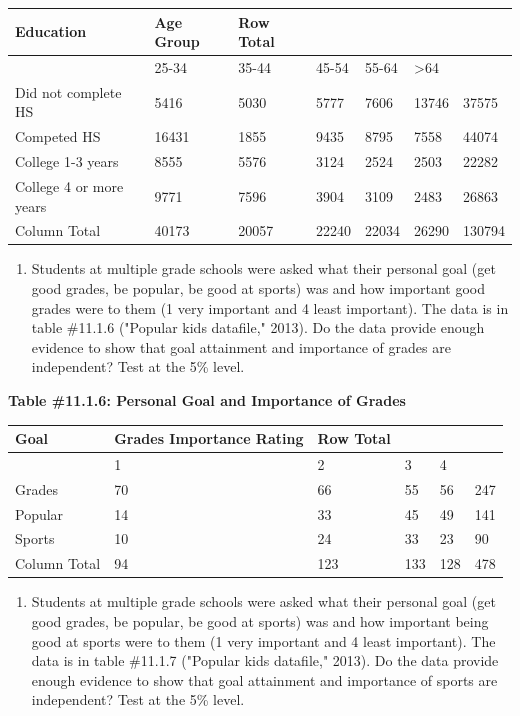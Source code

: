 \documentclass[
]{book}
\providecommand{\tightlist}{%
  \setlength{\itemsep}{0pt}\setlength{\parskip}{0pt}}
\begin{document}
\begin{longtable}[]{@{}lllllll@{}}
\toprule
Education & Age Group & Row Total & & & &\tabularnewline
\midrule
\endhead
& 25-34 & 35-44 & 45-54 & 55-64 & \textgreater64 &\tabularnewline
Did not complete HS & 5416 & 5030 & 5777 & 7606 & 13746 & 37575\tabularnewline
Competed HS & 16431 & 1855 & 9435 & 8795 & 7558 & 44074\tabularnewline
College 1-3 years & 8555 & 5576 & 3124 & 2524 & 2503 & 22282\tabularnewline
College 4 or more years & 9771 & 7596 & 3904 & 3109 & 2483 & 26863\tabularnewline
Column Total & 40173 & 20057 & 22240 & 22034 & 26290 & 130794\tabularnewline
\bottomrule
\end{longtable}

\begin{enumerate}
\def\labelenumi{\arabic{enumi}.}
\setcounter{enumi}{4}
\tightlist
\item
  Students at multiple grade schools were asked what their personal goal (get good grades, be popular, be good at sports) was and how important good grades were to them (1 very important and 4 least important). The data is in table \#11.1.6 ("Popular kids datafile," 2013). Do the data provide enough evidence to show that goal attainment and importance of grades are independent? Test at the 5\% level.
\end{enumerate}

\textbf{Table \#11.1.6: Personal Goal and Importance of Grades}

\begin{longtable}[]{@{}llllll@{}}
\toprule
Goal & Grades Importance Rating & Row Total & & &\tabularnewline
\midrule
\endhead
& 1 & 2 & 3 & 4 &\tabularnewline
Grades & 70 & 66 & 55 & 56 & 247\tabularnewline
Popular & 14 & 33 & 45 & 49 & 141\tabularnewline
Sports & 10 & 24 & 33 & 23 & 90\tabularnewline
Column Total & 94 & 123 & 133 & 128 & 478\tabularnewline
\bottomrule
\end{longtable}

\begin{enumerate}
\def\labelenumi{\arabic{enumi}.}
\setcounter{enumi}{5}
\tightlist
\item
  Students at multiple grade schools were asked what their personal goal (get good grades, be popular, be good at sports) was and how important being good at sports were to them (1 very important and 4 least important). The data is in table \#11.1.7 ("Popular kids datafile," 2013). Do the data provide enough evidence to show that goal attainment and importance of sports are independent? Test at the 5\% level.
\end{enumerate}
\end{document}
